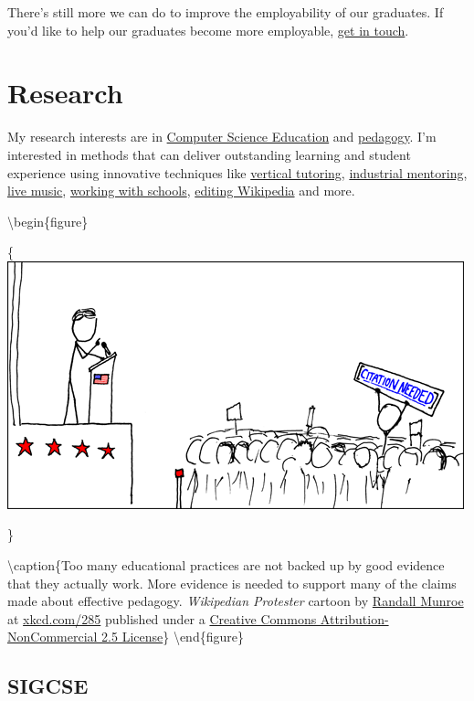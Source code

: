 \documentclass[
  12pt,
]{book}
\begin{document}
There's still more we can do to improve the employability of our graduates. If you'd like to help our graduates become more employable, \href{Contact}{get in touch}.

\hypertarget{research}{%
\chapter{Research}\label{research}}

My research interests are in \href{https://en.wikipedia.org/wiki/Computer_science_education}{Computer Science Education} and \href{https://en.wikipedia.org/wiki/Pedagogy}{pedagogy}. \citep{CERhandbook, JohnBiggs2011, Fry2014} I'm interested in methods that can deliver outstanding learning and student experience using innovative techniques like \protect\hyperlink{vt}{vertical tutoring}, \href{https://www.cs.manchester.ac.uk/connect/business-engagement/industrial-mentoring/}{industrial mentoring}, \protect\hyperlink{tuningcomplete}{live music}, \protect\hyperlink{coding-their-future}{working with schools}, \protect\hyperlink{wikipedia}{editing Wikipedia} and more.

\textbackslash begin\{figure\}

\{\centering \includegraphics[width=0.7\linewidth]{images/wikipedian_protester}

\}

\textbackslash caption\{Too many educational practices are not backed up by good evidence that they actually work. More evidence is needed to support many of the claims made about effective pedagogy. \emph{Wikipedian Protester} cartoon by \href{https://en.wikipedia.org/wiki/Randall_Munroe}{Randall Munroe} at \href{https://xkcd.com/285/}{xkcd.com/285} published under a \href{https://creativecommons.org/licenses/by-nc/2.5/}{Creative Commons Attribution-NonCommercial 2.5 License}\}\label{fig:unnamed-chunk-5}
\textbackslash end\{figure\}

\hypertarget{sigcse}{%
\section{SIGCSE}\label{sigcse}}
\end{document}
